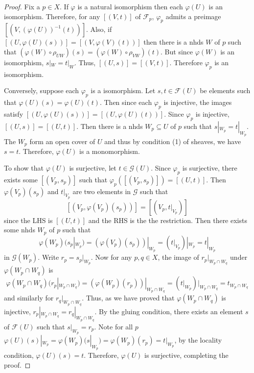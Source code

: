 \documentclass[12pt]{article}
\theoremstyle{remark}
\begin{document}
	\begin{proof}
	Fix a $p\in X$. If $\varphi$ is a natural isomorphism then each $\varphi(U)$ is an isomorphism. Therefore, for any $[(V, t)]$ of $\mathscr F_p$, $\varphi_p$ admits a preimage $[(V, (\varphi(U))^{-1}(t))]$. Also, if $[(U, \varphi(U)(s))]=[(V, \varphi(V)(t))]$ then there is a nhds $W$ of $p$ such that $(\varphi(W)\circ\rho_{UW})(s)=(\varphi(W)\circ\rho_{VW})(t)$. But since $\varphi(W)$ is an isomorphism, $s|_W=t|_W$. Thus, $[(U, s)]=[(V, t)]$. Therefore $\varphi_p$ is an isomorphism.
	
	Conversely, suppose each $\varphi_p$ is a isomorphism. Let $s, t\in \mathscr{F}(U)$ be elements such that $\varphi(U)(s)=\varphi(U)(t)$. Then since each $\varphi_p$ is injective, the images satisfy $[(U, \varphi(U)(s))]=[(U, \varphi(U)(t))]$. Since $\varphi_p$ is injective, $[(U, s)]=[(U, t)]$. Then there is a nhds $W_p\subseteq U$ of $p$ such that $s|_{W_p}=t|_{W_p}$. The $W_p$ form an open cover of $U$ and thus by condition (1) of sheaves, we have $s=t$. Therefore, $\varphi(U)$ is a monomorphism.
	
	To show that $\varphi(U)$ is surjective, let $t\in\mathscr G(U)$. Since $\varphi_p$ is surjective, there exists some $[(V_p, s_p)]$ such that $\varphi_p([(V_p, s_p)])=[(U, t)]$. Then $\varphi(V_p)(s_p)$ and $t|_{V_p}$ are two elements in $\mathscr G$ such that
	\[[(V_p, \varphi(V_p)(s_p))]=[(V_p, t|_{V_p})]\]
	since the LHS is $[(U, t)]$ and the RHS is the the restriction. Then there exists some nhds $W_p$ of $p$ such that 
	\[\varphi(W_p)(s_p|_{W_p})=\left(\varphi(V_p)(s_p)\right)|_{W_p}=\left(t|_{V_p}\right)|_{W_p}=t|_{W_p}\]
	in $\mathscr G(W_p)$. Write $r_p=s_p|_{W_p}$. Now for any $p, q\in X$, the image of $r_p|_{W_p\cap W_q}$ under $\varphi(W_p\cap W_q)$ is
	\[\varphi(W_p\cap W_q)(r_p|_{W_p\cap W_q})=\left(\varphi(W_p)(r_p)\right)|_{W_p\cap W_q}=\left(t|_{W_p}\right)|_{W_p\cap W_q}=t_{W_p\cap W_q}\]
	and similarly for $r_q|_{W_p\cap W_q}$. Thus, as we have proved that $\varphi(W_p\cap W_q)$ is injective, $r_p|_{W_p\cap W_q}=r_q|_{W_p\cap W_q}$. By the gluing condition, there exists an element $s$ of $\mathscr F(U)$ such that $s|_{W_p}=r_p$. Note for all $p$ $\varphi(U)(s)|_{W_p}=\varphi(W_p)(s|_{W_p})=\varphi(W_p)(r_p)=t|_{W_p}$, by the locality condition, $\varphi(U)(s)=t$. Therefore, $\varphi(U)$ is surjective, completing the proof.
	\end{proof}
\end{document}
